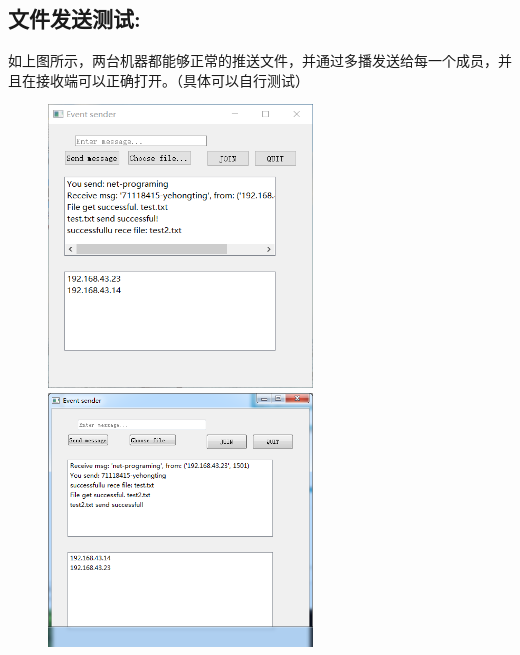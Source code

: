 \documentclass[UTF8]{ctexart}
\begin{document}
\subsection{文件发送测试: }{如上图所示，两台机器都能够正常的推送文件，并通过多播发送给每一个成员，并且在接收端可以正确打开。（具体可以自行测试）}
\begin{figure}
	\centering
	\begin{minipage}{7cm}
		\includegraphics[width=7cm]{A.png}
	\end{minipage}
	\begin{minipage}{7cm}
		\includegraphics[width=7cm]{B.png}
	\end{minipage}\\
\end{figure}
\end{document}
